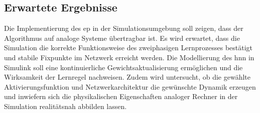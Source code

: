 \subsection{Erwartete Ergebnisse}

Die Implementierung des \ac{ep} in der Simulationsumgebung soll zeigen, dass der Algorithmus auf analoge Systeme übertragbar ist. Es wird erwartet, dass die Simulation die korrekte Funktionsweise des zweiphasigen Lernprozesses bestätigt und stabile Fixpunkte im Netzwerk erreicht werden. Die Modellierung des \ac{hnn} in Simulink soll eine kontinuierliche Gewichtsaktualisierung ermöglichen und die Wirksamkeit der Lernregel nachweisen. Zudem wird untersucht, ob die gewählte Aktivierungsfunktion und Netzwerkarchitektur die gewünschte Dynamik erzeugen und inwiefern sich die physikalischen Eigenschaften analoger Rechner in der Simulation realitätsnah abbilden lassen.
